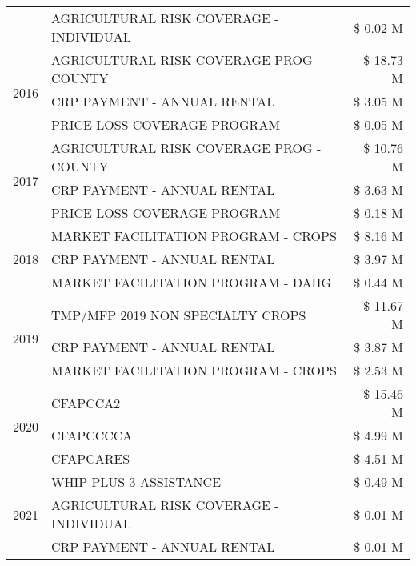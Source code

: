 \begin{tabular}{llr}
 & AGRICULTURAL RISK COVERAGE - INDIVIDUAL & \$ 0.02 M \\
\cline{1-3}
\multirow[t]{3}{*}{2016} & AGRICULTURAL RISK COVERAGE PROG - COUNTY      & \$ 18.73 M \\
 & CRP PAYMENT - ANNUAL RENTAL                   & \$ 3.05 M \\
 & PRICE LOSS COVERAGE PROGRAM                   & \$ 0.05 M \\
\cline{1-3}
\multirow[t]{3}{*}{2017} & AGRICULTURAL RISK COVERAGE PROG - COUNTY & \$ 10.76 M \\
 & CRP PAYMENT - ANNUAL RENTAL & \$ 3.63 M \\
 & PRICE LOSS COVERAGE PROGRAM & \$ 0.18 M \\
\cline{1-3}
\multirow[t]{3}{*}{2018} & MARKET FACILITATION PROGRAM - CROPS & \$ 8.16 M \\
 & CRP PAYMENT - ANNUAL RENTAL & \$ 3.97 M \\
 & MARKET FACILITATION PROGRAM - DAHG & \$ 0.44 M \\
\cline{1-3}
\multirow[t]{3}{*}{2019} & TMP/MFP 2019 NON SPECIALTY CROPS & \$ 11.67 M \\
 & CRP PAYMENT - ANNUAL RENTAL & \$ 3.87 M \\
 & MARKET FACILITATION PROGRAM - CROPS & \$ 2.53 M \\
\cline{1-3}
\multirow[t]{3}{*}{2020} & CFAPCCA2 & \$ 15.46 M \\
 & CFAPCCCCA & \$ 4.99 M \\
 & CFAPCARES & \$ 4.51 M \\
\cline{1-3}
\multirow[t]{3}{*}{2021} & WHIP PLUS 3 ASSISTANCE & \$ 0.49 M \\
 & AGRICULTURAL RISK COVERAGE - INDIVIDUAL & \$ 0.01 M \\
 & CRP PAYMENT - ANNUAL RENTAL & \$ 0.01 M \\
\cline{1-3}
\bottomrule
\end{tabular}
